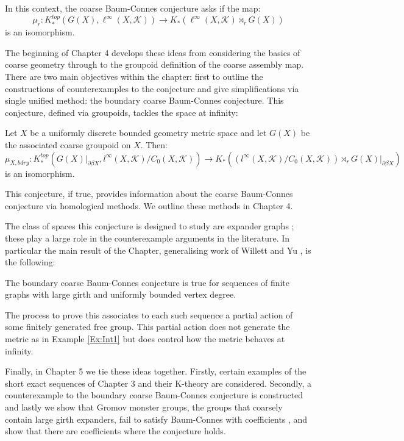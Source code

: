 In this context, the coarse Baum-Connes conjecture asks if the map:
\begin{equation*}
\mu_{r}:K_{*}^{top}(G(X), \ell^{\infty}(X,\mathcal{K})) \rightarrow K_{*}(\ell^{\infty}(X,\mathcal{K})\rtimes_{r}G(X))
\end{equation*}
is an isomorphism.

The beginning of Chapter 4 develops these ideas from considering the basics of coarse geometry through to the groupoid definition of the coarse assembly map. There are two main objectives within the chapter: first to outline the constructions of counterexamples to the conjecture \cite{higsonpreprint,MR1911663,explg1,explg2,MR2568691} and give simplifications via single unified method: the boundary coarse Baum-Connes conjecture. This conjecture, defined via groupoids, tackles the space at infinity:
\begin{conjecture}
Let $X$ be a uniformly discrete bounded geometry metric space and let $G(X)$ be the associated coarse groupoid on $X$. Then:
\begin{equation*}
\mu_{X,bdry}:K_{*}^{top}(G(X)|_{\partial\beta X}, l^{\infty}(X,\mathcal{K})/C_{0}(X,\mathcal{K})) \rightarrow K_{*}((l^{\infty}(X,\mathcal{K})/C_{0}(X,\mathcal{K}))\rtimes_{r}G(X)|_{\partial\beta X})
\end{equation*}
is an isomorphism.
\end{conjecture}
This conjecture, if true, provides information about the coarse Baum-Connes conjecture via homological methods. We outline these methods in Chapter 4.

The class of spaces this conjecture is designed to study are expander graphs \cite{MR2247919}; these play a large role in the counterexample arguments in the literature. In particular the main result of the Chapter, generalising work of Willett and Yu \cite{explg1}, is the following:
\begin{thm}
The boundary coarse Baum-Connes conjecture is true for sequences of finite graphs with large girth and uniformly bounded vertex degree.
\end{thm}

The process to prove this associates to each such sequence a partial action of some finitely generated free group. This partial action does not generate the metric as in Example \ref{Ex:Int1} but does control how the metric behaves at infinity. 

Finally, in Chapter 5 we tie these ideas together. Firstly, certain examples of the short exact sequences of Chapter 3 and their K-theory are considered. Secondly, a counterexample to the boundary coarse Baum-Connes conjecture is constructed and lastly we show that Gromov monster groups, the groups that coarsely contain large girth expanders, fail to satisfy Baum-Connes with coefficients \cite{MR1978492,exrangrps}, and show that there are coefficients where the conjecture holds.

